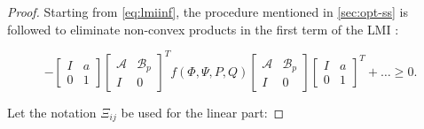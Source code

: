 \begin{proof}
	Starting from \autoref{eq:lmiinf}, the procedure mentioned in \autoref{sec:opt-ss} is followed to eliminate non-convex products in the first term of the \gls{LMI} \cite[Th. 1]{Li2014}:

	\begin{equation} \label{eq:a-1}
		-\begin{bmatrix}
			I & a \\
			0 & 1
		\end{bmatrix}
		\begin{bmatrix}
			\mathcal{A} & \mathcal{B}_p \\
			I & 0
		\end{bmatrix}^T
		f\left(\Phi, \Psi, P, Q\right)
		\begin{bmatrix}
			\mathcal{A} & \mathcal{B}_p \\
			I & 0
		\end{bmatrix} 
		\begin{bmatrix}
			I & a \\
			0 & 1
		\end{bmatrix}^T +
		\ldots 
		\geq 0.
	\end{equation}

	Let the notation $\Xi_{ij}$ be used for the linear part:
	

\end{proof}
